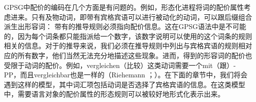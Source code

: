 GPSG中配价的编码在几个方面是有问题的。例如，形态化进程将词的配价属性考虑进来。只有及物动词，即带有宾格宾语可以进行被动化的动词，可以跟后缀组合派生出形容词：
\eal\settowidth{}
\zl
带有的推导规则必须指向配价信息。这在GPSG语法中是不可能的，因为每个词条都只能指派给一个数字，该数字说明可以使用的这个词条的规则相关的信息。对于的推导来说，我们必须在推导规则中列出与宾格宾语的规则相对应的所有数字，他们当然无法充分地描述这些现象。进而，得到的形容词的配价也受限于动词的配价。例如，vergleichen（比较）这类动词需要一个mit（跟）-PP，而且vergleichbar也是一样的（Riehemann \citeyear[, 54]{Riehemann93a}；\citeyear[]{Riehemann98a}）。在下面的章节中，我们将会遇到这样的模型，其中词汇项包括动词是否选择了宾格宾语的信息。在这类模型中，需要语言对象的配价属性的形态规则可以被较好地形式化表示出来。


